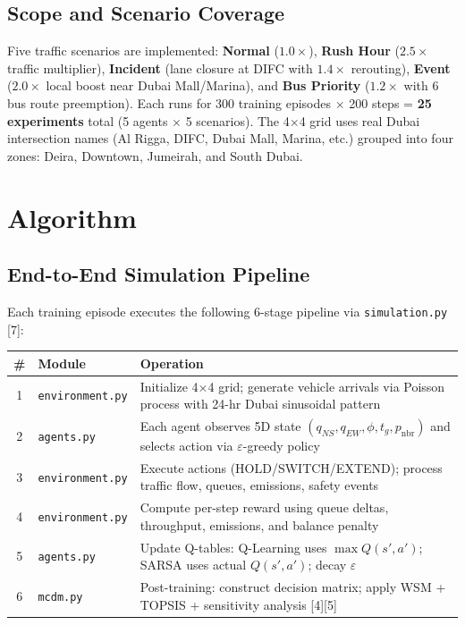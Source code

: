\documentclass[11pt, a4paper]{article}
\begin{document}
\subsection{Scope and Scenario Coverage}

Five traffic scenarios are implemented: \textbf{Normal} ($1.0\times$), \textbf{Rush Hour} ($2.5\times$ traffic multiplier), \textbf{Incident} (lane closure at DIFC with $1.4\times$ rerouting), \textbf{Event} ($2.0\times$ local boost near Dubai Mall/Marina), and \textbf{Bus Priority} ($1.2\times$ with 6 bus route preemption). Each runs for 300 training episodes $\times$ 200 steps = \textbf{25 experiments} total (5 agents $\times$ 5 scenarios). The 4$\times$4 grid uses real Dubai intersection names (Al Rigga, DIFC, Dubai Mall, Marina, etc.) grouped into four zones: Deira, Downtown, Jumeirah, and South Dubai.

\section{Algorithm}

\subsection{End-to-End Simulation Pipeline}

Each training episode executes the following 6-stage pipeline via \texttt{simulation.py} [7]:

\begin{table}[H]
\centering
\small
\begin{tabularx}{\textwidth}{clX}
    \toprule
    \textbf{\#} & \textbf{Module} & \textbf{Operation} \\
    \midrule
    1 & \texttt{environment.py} & Initialize 4$\times$4 grid; generate vehicle arrivals via Poisson process with 24-hr Dubai sinusoidal pattern \\
    2 & \texttt{agents.py} & Each agent observes 5D state $(q_{NS}, q_{EW}, \phi, t_g, p_{\text{nbr}})$ and selects action via $\varepsilon$-greedy policy \\
    3 & \texttt{environment.py} & Execute actions (HOLD/SWITCH/EXTEND); process traffic flow, queues, emissions, safety events \\
    4 & \texttt{environment.py} & Compute per-step reward using queue deltas, throughput, emissions, and balance penalty \\
    5 & \texttt{agents.py} & Update Q-tables: Q-Learning uses $\max Q(s',a')$; SARSA uses actual $Q(s',a')$; decay $\varepsilon$ \\
    6 & \texttt{mcdm.py} & Post-training: construct decision matrix; apply WSM + TOPSIS + sensitivity analysis [4][5] \\
    \bottomrule
\end{tabularx}
\end{table}
\end{document}
